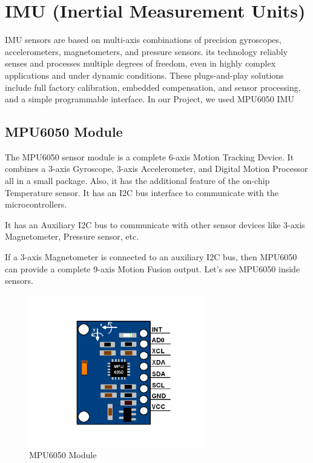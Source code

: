 
\section{IMU (Inertial Measurement Units)}
\label{ap:b.imu}
IMU sensors are based on multi-axis combinations of precision gyroscopes, accelerometers, magnetometers, and pressure sensors. its technology reliably senses and processes multiple degrees of freedom, even in highly complex applications and under dynamic conditions. These plugs-and-play solutions include full factory calibration, embedded compensation, and sensor processing, and a simple programmable interface. In our Project, we used MPU6050 IMU 

\subsection{MPU6050 Module}
The MPU6050 sensor module is a complete 6-axis Motion Tracking Device. It combines a 3-axis Gyroscope, 3-axis Accelerometer, and Digital Motion Processor all in a small package. Also, it has the additional feature of the on-chip Temperature sensor. It has an I2C bus interface to communicate with the microcontrollers.

It has an Auxiliary I2C bus to communicate with other sensor devices like 3-axis Magnetometer, Pressure sensor, etc.

If a 3-axis Magnetometer is connected to an auxiliary I2C bus, then MPU6050 can provide a complete 9-axis Motion Fusion output.
Let’s see MPU6050 inside sensors.

\begin{figure}[h!]
     \centering
         \centering
         \includegraphics[scale=0.5]{./Figures/AppendixB/mpu.png}
         \caption{MPU6050 Module}
         \label{fig: MPU6050 Module}
\end{figure}

